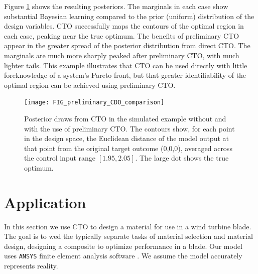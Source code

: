 \documentclass[12pt]{article}
\begin{document}
%
Figure \ref{fig:toy_sim_results} shows the resulting posteriors. %
%
The marginals in each case show substantial Bayesian learning compared to the prior (uniform) distribution of the design variables.
%
CTO successfully maps the contours of the optimal region in each case, peaking near the true optimum.
%
The benefits of preliminary CTO appear in the greater spread of the posterior distribution from direct CTO.
%
The marginals are much more sharply peaked after preliminary CTO, with much lighter tails.
%
%
%
This example illustrates that CTO can be used directly with little foreknowledge of a system's Pareto front, but that greater identifiability of the optimal region can be achieved using preliminary CTO.

\begin{figure}
\centering
\texttt{[image: FIG\_preliminary\_CDO\_comparison]}
\caption{Posterior draws from CTO in the simulated example without and with the use of preliminary CTO. The contours show, for each point in the design space, the Euclidean distance of the model output at that point from the original target outcome (0,0,0), averaged across the control input range $[1.95,2.05]$. The large dot shows the true optimum.}
\label{fig:toy_sim_results}
\end{figure}



\section{Application}\label{application}

In this section we use CTO to design a material for use in a wind turbine blade. %
%
The goal is to wed the typically separate tasks of material selection and material design, designing a composite to optimize performance in a blade.
%
Our model uses \texttt{ANSYS} finite element analysis software \citep{ansys}.
We assume the model accurately represents reality.
\end{document}
